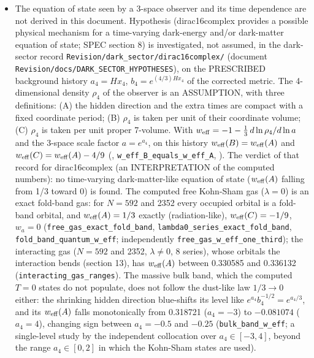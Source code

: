 \documentclass[11pt]{article}
\begin{document}
\begin{itemize}
\item The equation of state seen by a 3-space observer and its time dependence are not derived in this document. Hypothesis (dirac16complex provides a possible physical mechanism for a time-varying dark-energy and/or dark-matter equation of state; SPEC section 8) is investigated, not assumed, in the dark-sector record \texttt{Revision\allowbreak{}/dark\_se\allowbreak{}ctor/dir\allowbreak{}ac16comp\allowbreak{}lex/} (document \texttt{Revision\allowbreak{}/docs/DA\allowbreak{}RK\_SECTO\allowbreak{}R\_HYPOTH\allowbreak{}ESES}), on the PRESCRIBED background history $a_4 = Hx_4$, $b_4 = e^{(4/3)Hx_4}$ of the corrected metric. The 4-dimensional density $\rho_4$ of the observer is an ASSUMPTION, with three definitions: (A) the hidden direction and the extra times are compact with a fixed coordinate period; (B) $\rho_4$ is taken per unit of their coordinate volume; (C) $\rho_4$ is taken per unit proper 7-volume. With $w_{\rm eff} = -1 - \tfrac13\,d\ln\rho_4/d\ln a$ and the 3-space scale factor $a = e^{a_4}$, on this history $w_{\rm eff}(B) = w_{\rm eff}(A)$ and $w_{\rm eff}(C) = w_{\rm eff}(A) - 4/9$ (\texttt{}, \texttt{w\_eff\_B\_\allowbreak{}equals\_w\allowbreak{}\_eff\_A}, \texttt{}). The verdict of that record for dirac16complex (an INTERPRETATION of the computed numbers): no time-varying dark-matter-like equation of state ($w_{\rm eff}(A)$ falling from 1/3 toward 0) is found. The computed free Kohn-Sham gas ($\lambda = 0$) is an exact fold-band gas: for $N = 592$ and 2352 every occupied orbital is a fold-band orbital, and $w_{\rm eff}(A) = 1/3$ exactly (radiation-like), $w_{\rm eff}(C) = -1/9$, $w_a = 0$ (\texttt{free\_gas\allowbreak{}\_exact\_f\allowbreak{}old\_band}, \texttt{lambda0\_\allowbreak{}series\_e\allowbreak{}xact\_fol\allowbreak{}d\_band}, \texttt{fold\_ban\allowbreak{}d\_quantu\allowbreak{}m\_w\_eff}; independently \texttt{free\_gas\allowbreak{}\_w\_eff\_o\allowbreak{}ne\_third}); the interacting gas ($N = 592$ and 2352, $\lambda \neq 0$, 8 series), whose orbitals the interaction bends (section 13), has $w_{\rm eff}(A)$ between 0.330585 and 0.336132 (\texttt{interact\allowbreak{}ing\_gas\_\allowbreak{}ranges}). The massive bulk band, which the computed $T = 0$ states do not populate, does not follow the dust-like law $1/3 \to 0$ either: the shrinking hidden direction blue-shifts its level like $e^{a_4}b_4^{-1/2} = e^{a_4/3}$, and its $w_{\rm eff}(A)$ falls monotonically from 0.318721 ($a_4 = -3$) to $-0.081074$ ($a_4 = 4$), changing sign between $a_4 = -0.5$ and $-0.25$ (\texttt{bulk\_ban\allowbreak{}d\_w\_eff}; a single-level study by the independent collocation over $a_4 \in [-3, 4]$, beyond the range $a_4 \in [0, 2]$ in which the Kohn-Sham states are used).

\end{itemize}
\end{document}
